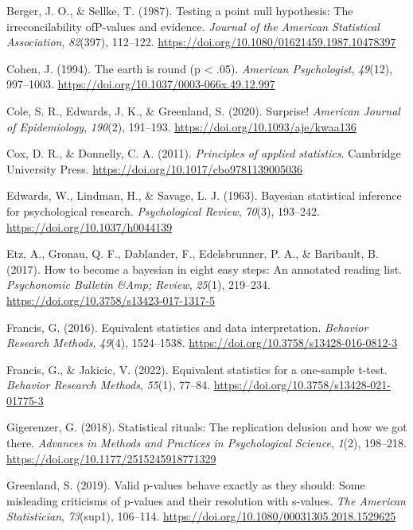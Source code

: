 \documentclass[
  man,
  floatsintext,
  longtable,
  nolmodern,
  notxfonts,
  notimes,
  colorlinks=true,linkcolor=blue,citecolor=blue,urlcolor=blue]{apa7}
\newlength{\cslhangindent}
\newenvironment{CSLReferences}[2] %
 {\begin{list}{}{%
  \setlength{\itemindent}{0pt}
  \setlength{\leftmargin}{0pt}
  \setlength{\parsep}{0pt}
  \ifodd #1
   \setlength{\leftmargin}{\cslhangindent}
   \setlength{\itemindent}{-1\cslhangindent}
  \fi
  \setlength{\itemsep}{#2\baselineskip}}}
 {\end{list}}
\begin{document}
\begin{CSLReferences}{1}{0}
Berger, J. O., \& Sellke, T. (1987). Testing a point null hypothesis:
The irreconcilability ofP-values and evidence. \emph{Journal of the
American Statistical Association}, \emph{82}(397), 112--122.
\url{https://doi.org/10.1080/01621459.1987.10478397}

Cohen, J. (1994). The earth is round (p \textless{} .05). \emph{American
Psychologist}, \emph{49}(12), 997--1003.
\url{https://doi.org/10.1037/0003-066x.49.12.997}

Cole, S. R., Edwards, J. K., \& Greenland, S. (2020). Surprise!
\emph{American Journal of Epidemiology}, \emph{190}(2), 191--193.
\url{https://doi.org/10.1093/aje/kwaa136}

Cox, D. R., \& Donnelly, C. A. (2011). \emph{Principles of applied
statistics}. Cambridge University Press.
\url{https://doi.org/10.1017/cbo9781139005036}

Edwards, W., Lindman, H., \& Savage, L. J. (1963). Bayesian statistical
inference for psychological research. \emph{Psychological Review},
\emph{70}(3), 193--242. \url{https://doi.org/10.1037/h0044139}

Etz, A., Gronau, Q. F., Dablander, F., Edelsbrunner, P. A., \&
Baribault, B. (2017). How to become a bayesian in eight easy steps: An
annotated reading list. \emph{Psychonomic Bulletin \&Amp; Review},
\emph{25}(1), 219--234. \url{https://doi.org/10.3758/s13423-017-1317-5}

Francis, G. (2016). Equivalent statistics and data interpretation.
\emph{Behavior Research Methods}, \emph{49}(4), 1524--1538.
\url{https://doi.org/10.3758/s13428-016-0812-3}

Francis, G., \& Jakicic, V. (2022). Equivalent statistics for a
one-sample t-test. \emph{Behavior Research Methods}, \emph{55}(1),
77--84. \url{https://doi.org/10.3758/s13428-021-01775-3}

Gigerenzer, G. (2018). Statistical rituals: The replication delusion and
how we got there. \emph{Advances in Methods and Practices in
Psychological Science}, \emph{1}(2), 198--218.
\url{https://doi.org/10.1177/2515245918771329}

Greenland, S. (2019). Valid p-values behave exactly as they should: Some
misleading criticisms of p-values and their resolution with s-values.
\emph{The American Statistician}, \emph{73}(sup1), 106--114.
\url{https://doi.org/10.1080/00031305.2018.1529625}


\end{CSLReferences}
\end{document}
